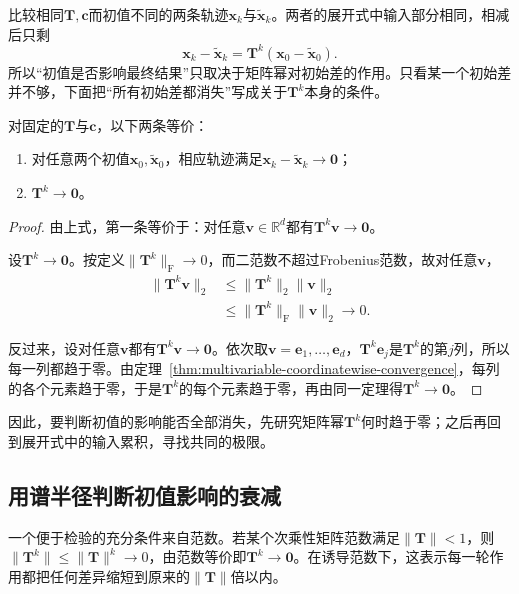 比较相同$\bm T,\bm c$而初值不同的两条轨迹$\bm x_k$与$\widetilde{\bm x}_k$。两者的展开式中输入部分相同，相减后只剩
\[
 \bm x_k-\widetilde{\bm x}_k=\bm T^k(\bm x_0-\widetilde{\bm x}_0).
\]
所以“初值是否影响最终结果”只取决于矩阵幂对初始差的作用。只看某一个初始差并不够，下面把“所有初始差都消失”写成关于$\bm T^k$本身的条件。

\begin{lemma}[初值差异消失的条件]
\label{lem:ls-affine-difference-decay}
对固定的$\bm T$与$\bm c$，以下两条等价：
\begin{enumerate}
 \item 对任意两个初值$\bm x_0,\widetilde{\bm x}_0$，相应轨迹满足$\bm x_k-\widetilde{\bm x}_k\to\bm0$；
 \item $\bm T^k\to\bm0$。
\end{enumerate}
\end{lemma}
\begin{proof}
由上式，第一条等价于：对任意$\bm v\in\mathbb R^d$都有$\bm T^k\bm v\to\bm0$。

设$\bm T^k\to\bm0$。按定义$\lVert\bm T^k\rVert_{\mathrm F}\to0$，而二范数不超过Frobenius范数，故对任意$\bm v$，
\[
\begin{aligned}
 \lVert\bm T^k\bm v\rVert_2&\leq\lVert\bm T^k\rVert_2\lVert\bm v\rVert_2\\
 &\leq\lVert\bm T^k\rVert_{\mathrm F}\lVert\bm v\rVert_2\to0 .
\end{aligned}
\]

反过来，设对任意$\bm v$都有$\bm T^k\bm v\to\bm0$。依次取$\bm v=\bm e_1,\ldots,\bm e_d$，$\bm T^k\bm e_j$是$\bm T^k$的第$j$列，所以每一列都趋于零。由定理~\ref{thm:multivariable-coordinatewise-convergence}，每列的各个元素趋于零，于是$\bm T^k$的每个元素趋于零，再由同一定理得$\bm T^k\to\bm0$。
\end{proof}
因此，要判断初值的影响能否全部消失，先研究矩阵幂$\bm T^k$何时趋于零；之后再回到展开式中的输入累积，寻找共同的极限。

\subsection{用谱半径判断初值影响的衰减}
\label{sec:ls-matrix-power-behavior}
\label{sec:linear-algebra-power-convergence}

一个便于检验的充分条件来自范数。若某个次乘性矩阵范数满足$\lVert\bm T\rVert<1$，则$\lVert\bm T^k\rVert\leq\lVert\bm T\rVert^k\to0$，由范数等价即$\bm T^k\to\bm0$。在诱导范数下，这表示每一轮作用都把任何差异缩短到原来的$\lVert\bm T\rVert$倍以内。

